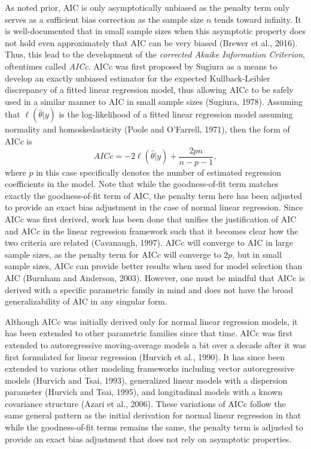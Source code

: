 		As noted prior, AIC is only asymptotically unbiased as the penalty term only serves as a sufficient bias correction as the sample size $n$ tends toward infinity. It is well-documented that
		in small sample sizes when this asymptotic property does not hold even approximately that AIC can be very biased (Brewer et al., 2016). Thus, this lead to the development of the 
		\textit{corrected Akaike Information Criterion}, oftentimes called \textit{AICc}. AICc was first proposed by Sugiura as a means to develop an exactly unbiased estimator for the expected
		Kullback-Leibler discrepancy of a fitted linear regression model, thus allowing AICc to be safely used in a similar manner to AIC in small sample sizes (Sugiura, 1978). Assuming that
		$\ell(\hat{\theta}|y)$ is the log-likelihood of a fitted linear regression model assuming normality and homoskedasticity (Poole and O'Farrell, 1971), then the form of AICc is 
		\begin{equation}
			AICc = -2 \ell(\hat{\theta}|y) + \frac{2 p n}{n - p - 1},
		\end{equation}
		where $p$ in this case specifically denotes the number of estimated regression coefficients in the model. Note that while the goodness-of-fit term matches exactly the goodness-of-fit term
		of AIC, the penalty term here has been adjusted to provide an exact bias adjustment in the case of  normal linear regression. Since AICc was first derived, work has been done that unifies
		the justification of AIC and AICc in the linear regression framework such that it becomes clear how the two criteria are related (Cavanaugh, 1997). AICc will converge to AIC in large sample
		sizes, as the penalty term for AICc will converge to $2p$, but in small sample sizes, AICc can provide better results when used for model selection than AIC (Burnham and Anderson, 2003).
		However, one must be mindful that AICc is derived with a specific parametric family in mind and does not have the broad generalizability of AIC in any singular form.

		Although AICc was initially derived only for normal linear regression models, it has been extended to other parametric families since that time. AICc was first extended to autoregressive
		moving-average models a bit over a decade after it was first formulated for linear regression (Hurvich et al., 1990). It has since been extended to various other modeling frameworks
		including vector autoregressive models (Hurvich and Tsai, 1993), generalized linear models with a dispersion parameter (Hurvich and Tsai, 1995), and longitudinal models with a known
		covariance structure (Azari et al., 2006). These variations of AICc follow the same general pattern as the initial derivation for normal linear regression in that while the goodness-of-fit
		terms remains the same, the penalty term is adjusted to provide an exact bias adjustment that does not rely on asymptotic properties.

